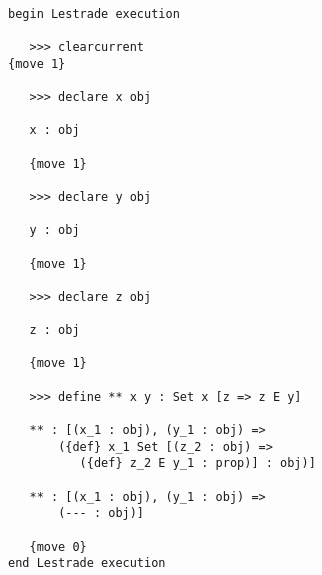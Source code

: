 \documentclass[12pt]{article}
\begin{document}
\begin{verbatim}

begin Lestrade execution

   >>> clearcurrent
{move 1}

   >>> declare x obj

   x : obj

   {move 1}

   >>> declare y obj

   y : obj

   {move 1}

   >>> declare z obj

   z : obj

   {move 1}

   >>> define ** x y : Set x [z => z E y]

   ** : [(x_1 : obj), (y_1 : obj) => 
       ({def} x_1 Set [(z_2 : obj) => 
          ({def} z_2 E y_1 : prop)] : obj)]

   ** : [(x_1 : obj), (y_1 : obj) => 
       (--- : obj)]

   {move 0}
end Lestrade execution
\end{verbatim}
\end{document}
